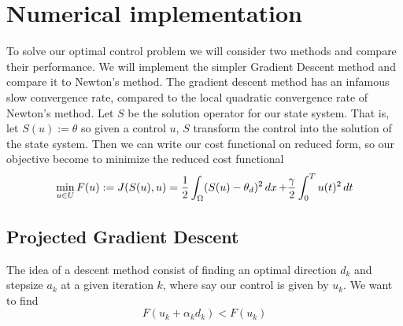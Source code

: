 \section{Numerical implementation}
To solve our optimal control problem we will consider two methods and compare their performance. We will implement the simpler Gradient Descent method and compare it to Newton's method. The gradient descent method has an infamous slow convergence rate, compared to the local quadratic convergence rate of Newton's method. Let $S$ be the solution operator for our state system. That is, let $S(u):=\theta$ so given a control $u$, $S$ transform the control into the solution of the state system. Then we can write our cost functional on reduced form, so our objective become to minimize the reduced cost functional 
\begin{equation}
\label{eq:optimization_prob}
    \min_{u \in U}F(u) := J(S(u),u) = \frac{1}{2}\int_{\Omega}(S(u) - \theta_d)^2 \mathop{dx}+ \frac{\gamma}{2}\int_0^Tu(t)^2\mathop{dt}
\end{equation}


\subsection{Projected Gradient Descent}
The idea of a descent method consist of finding an optimal direction $d_k$ and stepsize $a_k$ at a given iteration $k$, where say our control is given by $u_k$. We want to find
\begin{equation*}
    F(u_k + \alpha_kd_k) < F(u_k)
\end{equation*}

